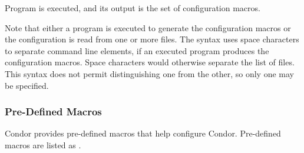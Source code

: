 Program  is executed, and its output
is the set of configuration macros.

Note that either a program is executed to generate the
configuration macros or the configuration is read from 
one or more files.
The syntax uses space characters to separate command line elements,
if an executed program produces the configuration macros.
Space characters would otherwise separate the list of files.
This syntax does not permit distinguishing one from the other,
so only one may be specified.

\subsubsection{\label{sec:Pre-Defined-Macros}Pre-Defined Macros}

Condor provides pre-defined macros that help configure Condor.
Pre-defined macros are listed as .

